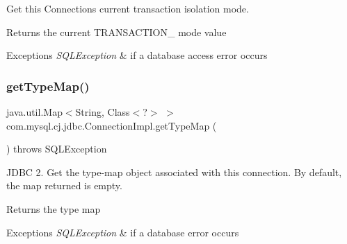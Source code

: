 Get this Connection\textquotesingle{}s current transaction isolation mode.

\begin{DoxyReturn}{Returns}
the current T\+R\+A\+N\+S\+A\+C\+T\+I\+O\+N\+\_\+ mode value 
\end{DoxyReturn}

\begin{DoxyExceptions}{Exceptions}
{\em S\+Q\+L\+Exception} & if a database access error occurs \\
\hline
\end{DoxyExceptions}
\mbox{\label{classcom_1_1mysql_1_1cj_1_1jdbc_1_1_connection_impl_a9960d23d0f9d8c6990c184e0a3e3630c}} 
\subsubsection{\texorpdfstring{get\+Type\+Map()}{getTypeMap()}}
{\footnotesize\ttfamily java.\+util.\+Map$<$String, Class$<$?$>$ $>$ com.\+mysql.\+cj.\+jdbc.\+Connection\+Impl.\+get\+Type\+Map (\begin{DoxyParamCaption}{ }\end{DoxyParamCaption}) throws S\+Q\+L\+Exception}

J\+D\+BC 2. Get the type-\/map object associated with this connection. By default, the map returned is empty.

\begin{DoxyReturn}{Returns}
the type map 
\end{DoxyReturn}

\begin{DoxyExceptions}{Exceptions}
{\em S\+Q\+L\+Exception} & if a database error occurs \\
\hline
\end{DoxyExceptions}
\mbox{\label{classcom_1_1mysql_1_1cj_1_1jdbc_1_1_connection_impl_a960584f75700b7d6f8418590e4474b03}} 
